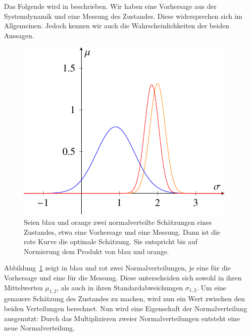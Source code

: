 Das Folgende wird in \cite{erdbeben:aragher_understanding_2012} beschrieben.
Wir haben eine Vorhersage aus der Systemdynamik und eine Messung des Zustandes.
Diese widersprechen sich im Allgemeinen. 
Jedoch kennen wir auch die Wahrscheinlichkeiten der beiden Aussagen. 

\begin{figure}
 \begin{center}
 \includegraphics[width=.5\linewidth,keepaspectratio]{papers/erdbeben/Gausskurve3.pdf}
 \caption{
    Seien blau und orange zwei normalverteilte Schätzungen eines Zustandes, etwa eine Vorhersage und eine Messung.
    Dann ist die rote Kurve die optimale Schätzung.
    Sie entspricht bis auf Normierung dem Produkt von blau und orange.}
 \label{erdbeben:Gauss3}
 \end{center}
\end{figure}
Abbildung~\ref{erdbeben:Gauss3} zeigt in blau und rot zwei Normalverteilungen,
je eine für die Vorhersage und eine für die Messung.
Diese unterscheiden sich sowohl in ihren Mittelwerten $\mu_{1,2}$, als auch in ihren Standardabweichungen $\sigma_{1,2}$.
Um eine genauere Schätzung des Zustandes zu machen, wird nun ein Wert zwischen den beiden Verteilungen berechnet. 
Nun wird eine Eigenschaft der Normalverteilung ausgenutzt:
Durch das Multiplizieren zweier Normalverteilungen entsteht eine neue Normalverteilung. 

